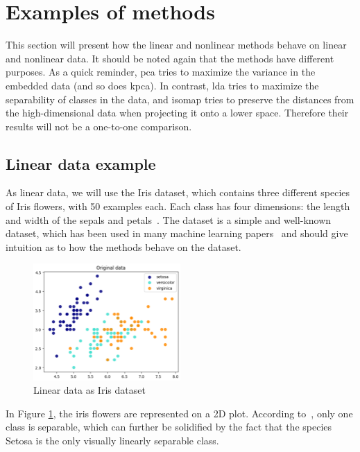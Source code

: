 \section{Examples of methods}\label{sec:examples-methods}
This section will present how the linear and nonlinear methods behave on linear and nonlinear data. It should be noted again that the methods have different purposes. As a quick reminder, \gls{pca} tries to maximize the variance in the embedded data (and so does \gls{kpca}). In contrast, \gls{lda} tries to maximize the separability of classes in the data, and \gls{isomap} tries to preserve the distances from the high-dimensional data when projecting it onto a lower space. Therefore their results will not be a one-to-one comparison.


\subsection{Linear data example}\label{subsec:linear-data-example}
As linear data, we will use the Iris dataset, which contains three different species of Iris flowers, with 50 examples each. Each class has four dimensions: the length and width of the sepals and petals~\cite{iris-dataset}. The dataset is a simple and well-known dataset, which has been used in many machine learning papers~\cite{iris-dataset} and should give intuition as to how the methods behave on the dataset.


\begin{figure}[htb!]
\centering
\includegraphics[width=0.5\textwidth]{figures/theory-example-figures/linear-data.png}
\caption{Linear data as Iris dataset}
\label{fig:linear-data}
\end{figure}

In Figure \ref{fig:linear-data}, the iris flowers are represented on a 2D plot. According to~\cite{iris-dataset}, only one class is separable, which can further be solidified by the fact that the species Setosa is the only visually linearly separable class.

